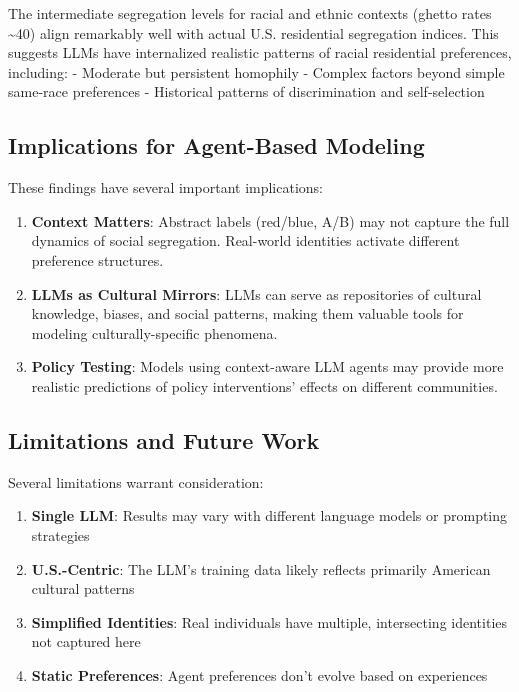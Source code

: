 \documentclass[
  11pt,
]{article}
\providecommand{\tightlist}{%
  \setlength{\itemsep}{0pt}\setlength{\parskip}{0pt}}
\begin{document}
The intermediate segregation levels for racial and ethnic contexts
(ghetto rates \textasciitilde40) align remarkably well with actual U.S.
residential segregation indices. This suggests LLMs have internalized
realistic patterns of racial residential preferences, including: -
Moderate but persistent homophily - Complex factors beyond simple
same-race preferences - Historical patterns of discrimination and
self-selection

\subsection{Implications for Agent-Based
Modeling}\label{implications-for-agent-based-modeling}

These findings have several important implications:

\begin{enumerate}
\def\labelenumi{\arabic{enumi}.}
\item
  \textbf{Context Matters}: Abstract labels (red/blue, A/B) may not
  capture the full dynamics of social segregation. Real-world identities
  activate different preference structures.
\item
  \textbf{LLMs as Cultural Mirrors}: LLMs can serve as repositories of
  cultural knowledge, biases, and social patterns, making them valuable
  tools for modeling culturally-specific phenomena.
\item
  \textbf{Policy Testing}: Models using context-aware LLM agents may
  provide more realistic predictions of policy interventions' effects on
  different communities.
\end{enumerate}

\subsection{Limitations and Future
Work}\label{limitations-and-future-work}

Several limitations warrant consideration:

\begin{enumerate}
\def\labelenumi{\arabic{enumi}.}
\tightlist
\item
  \textbf{Single LLM}: Results may vary with different language models
  or prompting strategies
\item
  \textbf{U.S.-Centric}: The LLM's training data likely reflects
  primarily American cultural patterns
\item
  \textbf{Simplified Identities}: Real individuals have multiple,
  intersecting identities not captured here
\item
  \textbf{Static Preferences}: Agent preferences don't evolve based on
  experiences
\end{enumerate}
\end{document}
